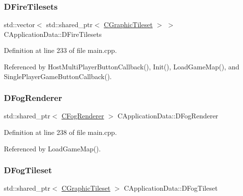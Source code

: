 \hypertarget{classCApplicationData_a68f7be36ab8b46ea7fca3bd3e79784cd}{}\label{classCApplicationData_a68f7be36ab8b46ea7fca3bd3e79784cd} 
\subsubsection{\texorpdfstring{D\+Fire\+Tilesets}{DFireTilesets}}
{\footnotesize\ttfamily std\+::vector$<$ std\+::shared\+\_\+ptr$<$ \hyperlink{classCGraphicTileset}{C\+Graphic\+Tileset} $>$ $>$ C\+Application\+Data\+::\+D\+Fire\+Tilesets\hspace{0.3cm}{\ttfamily [protected]}}



Definition at line 233 of file main.\+cpp.



Referenced by Host\+Multi\+Player\+Button\+Callback(), Init(), Load\+Game\+Map(), and Single\+Player\+Game\+Button\+Callback().

\hypertarget{classCApplicationData_ad825b9b196c31f92700541e1332009cc}{}\label{classCApplicationData_ad825b9b196c31f92700541e1332009cc} 
\subsubsection{\texorpdfstring{D\+Fog\+Renderer}{DFogRenderer}}
{\footnotesize\ttfamily std\+::shared\+\_\+ptr$<$ \hyperlink{classCFogRenderer}{C\+Fog\+Renderer} $>$ C\+Application\+Data\+::\+D\+Fog\+Renderer\hspace{0.3cm}{\ttfamily [protected]}}



Definition at line 238 of file main.\+cpp.



Referenced by Load\+Game\+Map().

\hypertarget{classCApplicationData_a9d9103087da6592c08b8d6c669665323}{}\label{classCApplicationData_a9d9103087da6592c08b8d6c669665323} 
\subsubsection{\texorpdfstring{D\+Fog\+Tileset}{DFogTileset}}
{\footnotesize\ttfamily std\+::shared\+\_\+ptr$<$ \hyperlink{classCGraphicTileset}{C\+Graphic\+Tileset} $>$ C\+Application\+Data\+::\+D\+Fog\+Tileset\hspace{0.3cm}{\ttfamily [protected]}}



